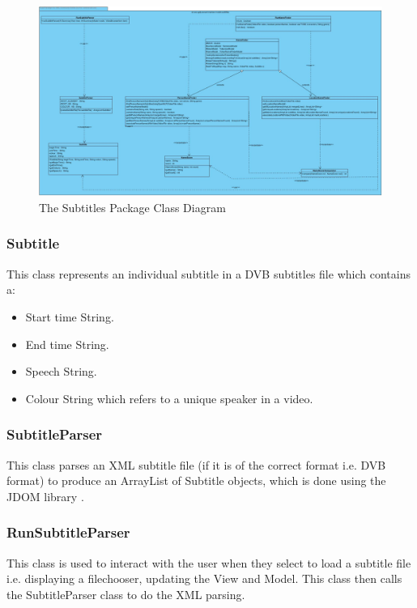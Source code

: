 \begin{figure}[h1]
\begin{center}
 \includegraphics[trim = 0mm 0mm 0mm 0mm, clip,
 scale=0.24]{Images/subtitles_package_class_diagram.jpg}
  \caption{The Subtitles Package Class Diagram}\label{fig:subtitlesClassdiagram}
 \end{center}
\end{figure}

\newpage
\subsubsection{Subtitle}
This class represents an individual subtitle in a DVB subtitles file which contains a:
\begin{itemize}
	\item{Start time String.}
	\item{End time String.}
	\item{Speech String.}
	\item{Colour String which refers to a unique speaker in a video.}
\end{itemize}

\subsubsection{SubtitleParser}
This class parses an XML subtitle file (if it is of the correct format i.e. DVB format) to produce an ArrayList of Subtitle objects, which is done using the JDOM library \cite{jdom}.

\subsubsection{RunSubtitleParser}
This class is used to interact with the user when they select to load a subtitle file i.e. displaying a filechooser, updating the View and 
Model. This class then calls the SubtitleParser class to do the XML parsing.

